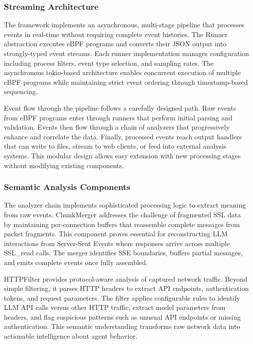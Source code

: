 \subsubsection{Streaming Architecture}

The framework implements an asynchronous, multi-stage pipeline that processes events in real-time without requiring complete event histories. The Runner abstraction executes eBPF programs and converts their JSON output into strongly-typed event streams. Each runner implementation manages configuration including process filters, event type selection, and sampling rates. The asynchronous tokio-based architecture enables concurrent execution of multiple eBPF programs while maintaining strict event ordering through timestamp-based sequencing.

Event flow through the pipeline follows a carefully designed path. Raw events from eBPF programs enter through runners that perform initial parsing and validation. Events then flow through a chain of analyzers that progressively enhance and correlate the data. Finally, processed events reach output handlers that can write to files, stream to web clients, or feed into external analysis systems. This modular design allows easy extension with new processing stages without modifying existing components.

\subsubsection{Semantic Analysis Components}

The analyzer chain implements sophisticated processing logic to extract meaning from raw events. ChunkMerger addresses the challenge of fragmented SSL data by maintaining per-connection buffers that reassemble complete messages from packet fragments. This component proves essential for reconstructing LLM interactions from Server-Sent Events where responses arrive across multiple SSL\_read calls. The merger identifies SSE boundaries, buffers partial messages, and emits complete events once fully assembled.

HTTPFilter provides protocol-aware analysis of captured network traffic. Beyond simple filtering, it parses HTTP headers to extract API endpoints, authentication tokens, and request parameters. The filter applies configurable rules to identify LLM API calls versus other HTTP traffic, extract model parameters from headers, and flag suspicious patterns such as unusual API endpoints or missing authentication. This semantic understanding transforms raw network data into actionable intelligence about agent behavior.

